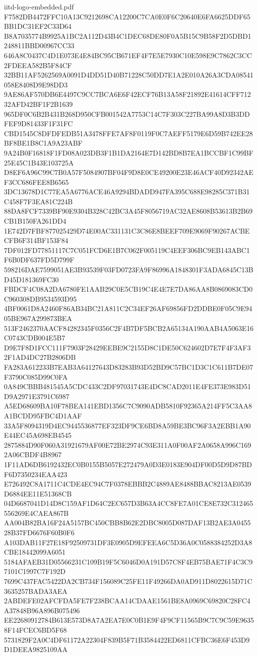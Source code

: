 \begin{filecontents*}[overwrite]{iitd-logo-embedded.pdf}
F7582DB4472FFC10A13C9212698CA12200C7CA0E0F6C20640E6FA6625DDF65BB1DC31EF2C33D64
B8A7035774B9925A1BC2A112D43B4C1DEC68DE80F0A5B15C9B58F2D5DBD1248811BBD00967CC33
646A8C0437C4D1E073E4E84BC95CB671EF4F7E5E7930C10E598E9C7862C3CC2FDEEA582B5F84CF
32BB11AF5262569A0091D4DD51D40B71228C50DD7E1A2E010A26A3CDA08541058E8408D9E98DD3
9AE86AF570DB6E4497C9CC7BCA6E6F42ECF76B13A58F21892E41614CFF71232AFD42BF1F2B1639
965DF0C6B2B431B268D950CFB001542A7753C14C7F303C227BA99A8D3B3DDFEF9D81433F1F31FC
CBD1545C8DFDFEDB51A3478FFE7AF8F0119F0C7AEFF5179E6D59B742EE28BF8BE1B8C1A9A23ABF
9A24B0F16818F1FD08A023DB3F1B1DA2164E7D142BD8B7EA1BCCBF1C99BF25E45C1B43E103725A
D8EF6A96C99C7B0A57F5084907BF04F9D8E0CE49200E23E46ACF40D92342AEF3CC686FEE8B6565
3DC13678D1C77EA5A6776ACE46A9294BDADD947FA395C688E98285C371B31C458F7F3EA81C224B
88DA8FCF7339BF90E9304B328C42BC3A45F8056719AC32AE8608B53613B2B69CB1B150FA261DD4
1E742D7FBF877025429D74E00AC331131C3C86E8BEEF709E9069F90267ACBECFB6F314BF153F84
7DF012FD77851117C7C051FCD6E1B7C062F005119C4EEF306BC9EB143ABC1F6B0DF637FD5D799F
598216DAE7599051AE3B93539F03FD0723FA9F86996A1848301F3ADA6845C13BD45D181369FC30
FBDCF4C08A2DA6780FE1AAB29C0E5CB19C4E4E7E7DA86AA8B0869083CD0C960308DB9534593D95
4BF0061D8A2460F86AB34BC21A811C2C34EF26AF69856FD2DDBE0F05C9E9405BE967A299873BEA
513F2462370AACF84282345F0356C2F4B7DF5BCB2A65134A190AAB4A5063E16C0743CDB004E5B7
D9E7F8D1FCC111F7903F28429EEBE9C2155D8C1DE50C624602D7E7F4F3AF32F1AD4DC27B2806DB
FA283A612233B7EAB3A64127643D83283B93D52BD9C57BC1D3C1C611B7DE07F3790C085D99C0FA
0A849CBBB481545A5CDC433C2DF97031743E4DC8CAD2011E4FE373E983D51D9A2971E3791C6987
A5ED68609BA10F78BEA141EBD1356C7C9090ADB5810F92365A214FF5C3AA8A1BCDD95FBC4D1AAF
33A5F8094319D4EC9445536877EF323DF9CE6BD8A59BE3BC96F3A2EBB1A90E44EC45A698EB4545
2875884D90F060A31921679AF00E72BE2974C93E311A0F00AF2A0658A996C1692A06CBDF4B8967
1F11AD6DB6192432EC0B0155B5057E272479A0D3E0183E904DF00D5D9D87BDF6D7350234EAA423
E726492C8A1711C4CDE4EC94C7F0378EBBB2C4889AE8488BBAC8213AE0539D6884EE11E51368CB
04D6687041D14D8C159AF1D64C2EC657D3B63A4CC8FE7A01CE8E732C312465556269E4CAEA867B
AA004B82BA16F24A5157BC450CBB8B62E2DBC8005D087DAF13B2AE3A045528B37FD6676F60B0F6
A103DAB11F27E18F92509731DF3E0905D9EFEEA6C5D36A0C0588384252D3A8CBE18442099A6051
5184AFAEB31D05566231C109B19F5C6046D0A191D57C8F4EB75BAE71F4C3C97101C1997C7F192D
7699C437FAC5422DA2CB734F156089C25FE11F49266DA0AD911D8022615D71C3635257BADA3AEA
2ABDEFE02AFCFDA5FE7F238BCAA14CDAAE1561BE8A0969C69820C28FC4A37848B96A896B075496
EE22680912784B613E573D8A7A2EA7E0C0B1E9F4F9CF11565B9C7C9C59E96358F14FCEC6BD5F68
5731829F2A0C4DF61172A22304F839B5F71B3584422ED6811CFBC36E6F453D9D1DEEA9825109AA

\end{filecontents*}
